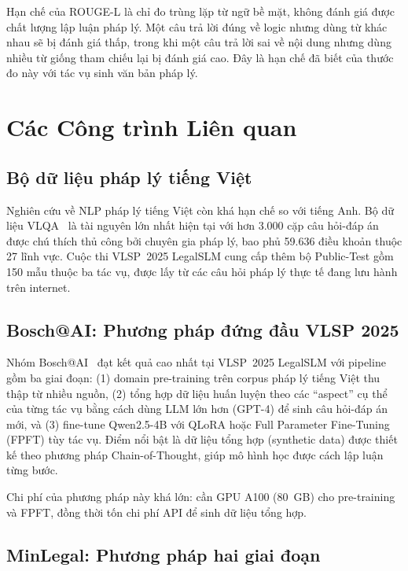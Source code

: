 \documentclass[fontsize=13pt,a4paper,oneside,DIV=calc,chapterprefix=true]{scrbook}
\begin{document}
Hạn chế của ROUGE-L là chỉ đo trùng lặp từ ngữ bề mặt, không đánh giá được chất lượng lập
luận pháp lý. Một câu trả lời đúng về logic nhưng dùng từ khác nhau sẽ bị đánh giá thấp,
trong khi một câu trả lời sai về nội dung nhưng dùng nhiều từ giống tham chiếu lại bị đánh
giá cao. Đây là hạn chế đã biết của thước đo này với tác vụ sinh văn bản pháp lý.

\section{Các Công trình Liên quan}

\subsection{Bộ dữ liệu pháp lý tiếng Việt}

Nghiên cứu về NLP pháp lý tiếng Việt còn khá hạn chế so với tiếng Anh. Bộ dữ liệu VLQA~\cite{vlqa2025}
là tài nguyên lớn nhất hiện tại với hơn 3.000 cặp câu hỏi-đáp án được chú thích thủ công bởi
chuyên gia pháp lý, bao phủ 59.636 điều khoản thuộc 27 lĩnh vực. Cuộc thi VLSP~2025 LegalSLM
cung cấp thêm bộ Public-Test gồm 150 mẫu thuộc ba tác vụ, được lấy từ các câu hỏi pháp lý
thực tế đang lưu hành trên internet.

\subsection{Bosch@AI: Phương pháp đứng đầu VLSP 2025}

Nhóm Bosch@AI~\cite{bosch2025} đạt kết quả cao nhất tại VLSP~2025 LegalSLM với pipeline gồm
ba giai đoạn: (1) domain pre-training trên corpus pháp lý tiếng Việt thu thập từ nhiều nguồn,
(2) tổng hợp dữ liệu huấn luyện theo các ``aspect'' cụ thể của từng tác vụ bằng cách dùng LLM
lớn hơn (GPT-4) để sinh câu hỏi-đáp án mới, và (3) fine-tune Qwen2.5-4B với QLoRA hoặc Full
Parameter Fine-Tuning (FPFT) tùy tác vụ. Điểm nổi bật là dữ liệu tổng hợp (synthetic data)
được thiết kế theo phương pháp Chain-of-Thought, giúp mô hình học được cách lập luận từng bước.

Chi phí của phương pháp này khá lớn: cần GPU A100 (80~GB) cho pre-training và FPFT, đồng thời
tốn chi phí API để sinh dữ liệu tổng hợp.

\subsection{MinLegal: Phương pháp hai giai đoạn}
\end{document}
